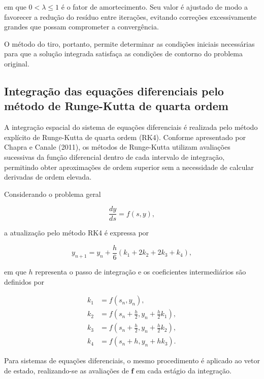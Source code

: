 \documentclass[arial,centeredequations,english,brazilian,oneside,section=TITLE]{ifes8}
\begin{document}
em que $0 < \lambda \leq 1$ é o fator de amortecimento. Seu valor
é ajustado de modo a favorecer a redução do resíduo entre
iterações, evitando correções excessivamente grandes que possam
comprometer a convergência.

O método do tiro, portanto, permite determinar as condições
iniciais necessárias para que a solução integrada satisfaça as
condições de contorno do problema original.

\subsection{Integração das equações diferenciais pelo método de
Runge-Kutta de quarta ordem}
\label{subsec:runge-kutta}

A integração espacial do sistema de equações diferenciais é
realizada pelo método explícito de Runge-Kutta de quarta ordem
(RK4). Conforme apresentado por Chapra e Canale (2011), os métodos
de Runge-Kutta utilizam avaliações sucessivas da função
diferencial dentro de cada intervalo de integração, permitindo
obter aproximações de ordem superior sem a necessidade de calcular
derivadas de ordem elevada.

Considerando o problema geral

\begin{equation}
  \frac{dy}{ds}=f(s,y),
  \label{eq:edo-escalar-rk}
\end{equation}

a atualização pelo método RK4 é expressa por

\begin{equation}
  y_{n+1}
  =
  y_n +
  \frac{h}{6}
  \left(k_1+2k_2+2k_3+k_4\right),
  \label{eq:rk4-atualizacao}
\end{equation}

em que $h$ representa o passo de integração e os coeficientes
intermediários são definidos por

\begin{align}
  k_1 &= f(s_n,y_n), \\
  k_2 &= f\left(s_n+\frac{h}{2},
                y_n+\frac{h}{2}k_1\right), \\
  k_3 &= f\left(s_n+\frac{h}{2},
                y_n+\frac{h}{2}k_2\right), \\
  k_4 &= f(s_n+h,y_n+hk_3).
\end{align}

Para sistemas de equações diferenciais, o mesmo procedimento é
aplicado ao vetor de estado, realizando-se as avaliações de
$\mathbf{f}$ em cada estágio da integração.
\end{document}
